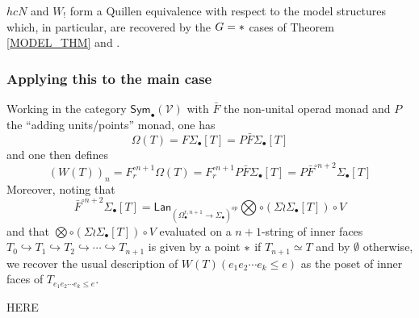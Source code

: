 \documentclass[a4paper,10pt
,draft
]{article}%
\renewcommand{\1}{\eta}%
\begin{document}
\begin{theorem}
      \label{CMW_THM}
      $hcN$ and $W_!$ form a Quillen equivalence with respect to the model structures
      which, in particular, are recovered by the $G = \**$ cases of Theorem \ref{MODEL_THM} and \cite[Thm. 2.1]{Per18}.
\end{theorem}














\subsubsection{Applying this to the main case}

Working in the category 
$\mathsf{Sym}_{\bullet}(\mathcal{V})$
with $\bar{F}$ the non-unital operad monad and $P$ the ``adding units/points'' monad, one has
\[
\Omega(T) = F \Sigma_{\bullet}[T] 
	= P \bar{F} \Sigma_{\bullet}[T]
\]
and one then defines
\[
\left(W(T)\right)_n 
	= F_r^{\circ n+1} \Omega(T)
	= F_r^{\circ n+1} P \bar{F} \Sigma_{\bullet}[T]
	= P \bar{F}^{\circ n+2} \Sigma_{\bullet}[T]
\]
Moreover, noting that
\[\bar{F}^{\circ n+2} \Sigma_{\bullet}[T]=
\mathsf{Lan}_{
\left(\Omega^{r,n+1}_{\bullet} \to \Sigma_{\bullet}\right)^{op}}
\bigotimes \circ (\Sigma\wr\Sigma_{\bullet}[T])\circ V\]
and that
$\bigotimes \circ (\Sigma\wr\Sigma_{\bullet}[T])\circ V$
evaluated on a $n+1$-string of inner faces
$T_0 \hookrightarrow T_1 
\hookrightarrow T_2 
\hookrightarrow \cdots
\hookrightarrow T_{n+1}$
is given by a point $\**$
if $T_{n+1} \simeq T$
and by $\emptyset$ otherwise,
we recover the usual description of 
$W(T)(e_1e_2\cdots e_k\leq e)$
as the poset of inner faces of 
$T_{e_1e_2\cdots e_k\leq e}$.



{\color{red} HERE}
\end{document}
